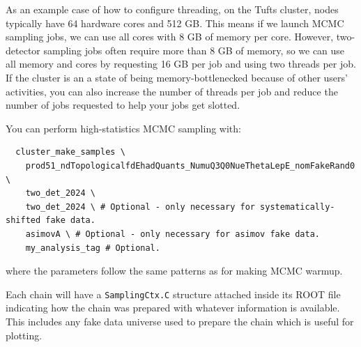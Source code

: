 \documentclass{article}
\begin{document}
As an example case of how to configure threading, on the Tufts cluster, nodes typically have 64 hardware cores and 512 GB. This means if we launch MCMC sampling jobs, we can use all cores with 8 GB of memory per core. However, two-detector sampling jobs often require more than 8 GB of memory, so we can use all memory and cores by requesting 16 GB per job and using two threads per job.
If the cluster is an a state of being memory-bottlenecked because of other users' activities, you can also increase the number of threads per job and reduce the number of jobs requested to help your jobs get slotted.

You can perform high-statistics MCMC sampling with:
\begin{verbatim}
  cluster_make_samples \
    prod51_ndTopologicalfdEhadQuants_NumuQ3Q0NueThetaLepE_nomFakeRand0 \
    two_det_2024 \
    two_det_2024 \ # Optional - only necessary for systematically-shifted fake data.
    asimovA \ # Optional - only necessary for asimov fake data.
    my_analysis_tag # Optional.
\end{verbatim}
where the parameters follow the same patterns as for making MCMC warmup.


Each chain will have a \texttt{Sampling\-Ctx\-.C} structure attached inside its ROOT file indicating how the chain was prepared with whatever information is available. This includes any fake data universe used to prepare the chain which is useful for plotting.
\end{document}
